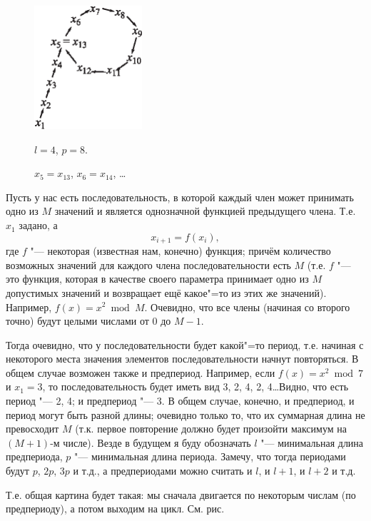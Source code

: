 

\begin{figure}
\includegraphics[width=4cm]{ideas/03_13_period/rho.eps}
\begin{center}
\footnotesize
$l=4$, $p=8$.

$x_5=x_{13}$, $x_6=x_{14}$, \dots
\end{center}
\end{figure}


Пусть у нас есть последовательность, в которой каждый член может принимать одно из $M$ 
значений и является однозначной функцией предыдущего члена. Т.е. $x_1$ задано, а
$$
x_{i+1}=f(x_i),
$$
где $f$ "--- некоторая (известная нам, конечно) функция; причём количество возможных значений 
для каждого члена последовательности есть $M$ (т.е. $f$ "--- это функция, которая в качестве 
своего параметра принимает одно из $M$ допустимых значений и возвращает ещё какое"=то из этих 
же значений). Например, $f(x)=x^2 \bmod M$. Очевидно, что все члены (начиная со второго 
точно) будут целыми числами от 0 до $M-1$.

Тогда очевидно, что у последовательности будет какой"=то период, т.е. начиная с некоторого 
места значения элементов последовательности начнут повторяться. В общем случае возможен также 
и предпериод. Например, если $f(x)=x^2 \bmod 7$ и $x_1=3$, то последовательность будет иметь 
вид 3, 2, 4, 2, 4\dots Видно, что есть период "--- 2, 4; и предпериод "--- 3. В общем случае, 
конечно, и предпериод, и период могут быть разной длины; очевидно только то, что их суммарная 
длина не превосходит $M$ (т.к. первое повторение должно будет произойти максимум на $(M+1)$-м 
числе). Везде в будущем я буду обозначать $l$ "--- минимальная длина предпериода, $p$ "--- 
минимальная длина периода. Замечу, что тогда периодами будут $p$, $2p$, $3p$ и т.д., а 
предпериодами можно считать и $l$, и $l+1$, и $l+2$ и т.д.

Т.е. общая картина будет такая: мы сначала двигается по некоторым числам (по предпериоду), а 
потом выходим на цикл. См. рис.

